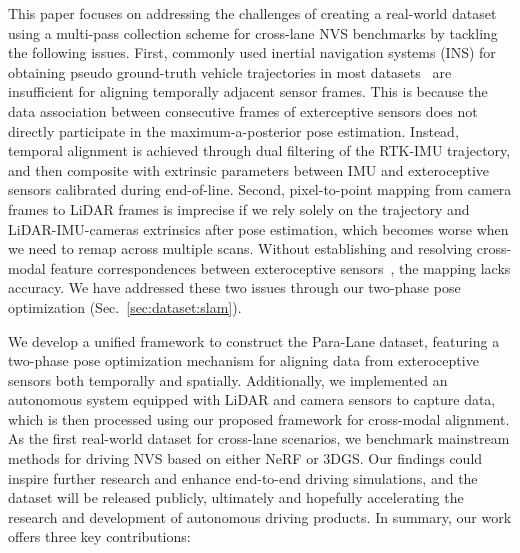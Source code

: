 This paper focuses on addressing the challenges of creating a real-world dataset using a multi-pass collection scheme for cross-lane NVS benchmarks by tackling the following issues. First, commonly used inertial navigation systems (INS) for obtaining pseudo ground-truth vehicle trajectories in most datasets~\cite{geiger2012kitti} are insufficient for aligning temporally adjacent sensor frames. This is because the data association between consecutive frames of exterceptive sensors does not directly participate in the maximum-a-posterior pose estimation. Instead, {temporal} alignment is achieved through dual filtering of the RTK-IMU trajectory, and {then composite with extrinsic parameters between IMU and exteroceptive sensors calibrated during end-of-line}.
Second, {pixel-to-point} mapping from camera frames to LiDAR frames is imprecise if we rely solely on the trajectory and LiDAR-IMU-cameras extrinsics after pose estimation{, which becomes worse when we need to remap across multiple scans.} Without establishing and resolving cross-modal feature correspondences between exteroceptive sensors~\cite{pascoe2015robust,song2016robust}, the mapping lacks accuracy. {We have addressed these two issues through our two-phase pose optimization (Sec.~\ref{sec:dataset:slam}).}

We develop a unified framework to construct the Para-Lane dataset, featuring a two-phase pose optimization mechanism for aligning data from exteroceptive sensors both temporally and spatially. Additionally, we implemented an autonomous system equipped with LiDAR and camera sensors to capture data, which is then processed using our proposed framework for cross-modal alignment.
As the first real-world dataset for cross-lane scenarios, we benchmark mainstream methods for driving NVS based on either NeRF or 3DGS. Our findings could inspire further research and enhance end-to-end driving simulations, and the dataset will be released publicly, ultimately and hopefully accelerating the research and development of autonomous driving products.
In summary, our work offers three key contributions:

